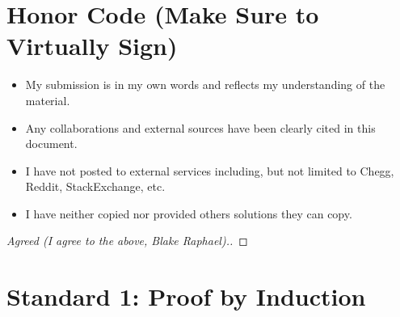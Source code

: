 \documentclass[11pt]{article}
\theoremstyle{definition}
\theoremstyle{definition}
\newtheorem{required}{Problem}
\theoremstyle{definition}
\begin{document}
\section{Honor Code (Make Sure to Virtually Sign)} \label{HonorCode}

\begin{itemize}
\item My submission is in my own words and reflects my understanding of the material.
\item Any collaborations and external sources have been clearly cited in this document.
\item I have not posted to external services including, but not limited to Chegg, Reddit, StackExchange, etc.
\item I have neither copied nor provided others solutions they can copy.
\end{itemize}


\begin{proof}[Agreed (I agree to the above, Blake Raphael).]
\end{proof}


\newpage
\section{Standard 1: Proof by Induction}
\end{document}
